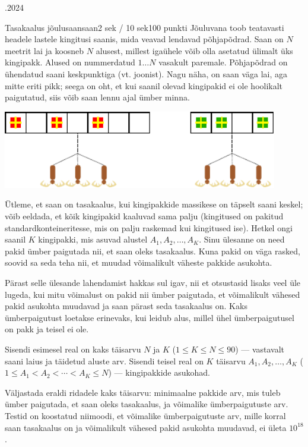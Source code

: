 \documentclass[a4paper,11pt]{article}
\begin{document}
\begin{ol}{\eio}{.2024}{\yle}{}
  \begin{yl}{6}{Tasakaalus jõulusaan}{saan}{2 sek / 10 sek}{100 punkti}
    Jõuluvana toob teatavasti headele lastele kingitusi saanis, mida veavad lendavad põhjapõdrad.
    Saan on $N$ meetrit lai ja koosneb $N$ alusest, millest igaühele võib olla asetatud ülimalt üks kingipakk.
    Alused on nummerdatud $1 \ldots N$ vasakult paremale.
    Põhjapõdrad on ühendatud saani keskpunktiga (vt. joonist).
    Nagu näha, on saan väga lai, aga mitte eriti pikk; seega on oht, et kui saanil olevad kingipakid
    ei ole hoolikalt paigutatud, siis võib saan lennu ajal ümber minna.

    \begin{center}
      \includegraphics[width=12cm]{fig.pdf}
    \end{center}

    Ütleme, et saan on tasakaalus, kui kingipakkide massikese on täpselt saani keskel; võib
    eeldada, et kõik kingipakid kaaluvad sama palju (kingitused on pakitud standardkonteineritesse, mis
    on palju raskemad kui kingitused ise).
    Hetkel ongi saanil $K$ kingipakki, mis asuvad alustel $A_1, A_2, \ldots, A_K$. Sinu ülesanne on need
    pakid ümber paigutada nii, et saan oleks tasakaalus. Kuna pakid on väga rasked, soovid sa seda teha nii,
    et muudad võimalikult väheste pakkide asukohta.

    Pärast selle ülesande lahendamist hakkas sul igav, nii et otsustasid lisaks veel üle lugeda, kui mitu võimalust
    on pakid nii ümber paigutada, et võimalikult vähesed pakid asukohta muudavad ja saan pärast seda tasakaalus on.
    Kaks ümberpaigutust loetakse
    erinevaks, kui leidub alus, millel ühel ümberpaigutusel on pakk ja teisel ei ole.

    \sis Sisendi esimesel real on kaks täisarvu $N$ ja $K$ ($1 \le K \le N \le 90$) --- vastavalt saani laius ja
    täidetud aluste arv. Sisendi teisel real on $K$ täisarvu $A_1, A_2, \ldots, A_K$
    ($1 \le A_1 < A_2 < \cdots < A_K \le N$) --- kingipakkide asukohad.

    \val Väljastada eraldi ridadele kaks täisarvu: minimaalne pakkide arv, mis tuleb ümber paigutada, et
    saan oleks tasakaalus, ja võimalike ümberpaigutuste arv. Testid on koostatud niimoodi, et võimalike
    ümberpaigutuste arv, mille korral saan tasakaalus on ja võimalikult vähesed pakid asukohta muudavad,
    ei ületa $10^{18}$.


\end{yl}
\end{ol}
\end{document}
